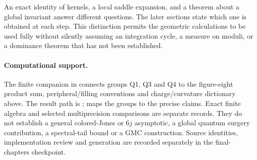 An exact identity of kernels, a local saddle expansion, and a
theorem about a global invariant answer different questions. The
later sections state which one is obtained at each step. This
distinction permits the geometric calculations to be used fully
without silently assuming an integration cycle, a measure on
moduli, or a dominance theorem that has not been established.

\paragraph{Computational support.}
The finite companion in 
connects groups Q1, Q3 and Q4 to the figure-eight product sum,
peripheral/filling conventions and charge/curvature dictionary above.
The result path is ;
 maps the groups to the precise claims.
Exact finite algebra and selected multiprecision comparisons are separate
records. They do not establish a general colored-Jones or $6j$ asymptotic,
a global quantum surgery contribution, a spectral-tail bound or a GMC
construction. Source identities, implementation review and generation
are recorded separately in the final-chapters checkpoint.

